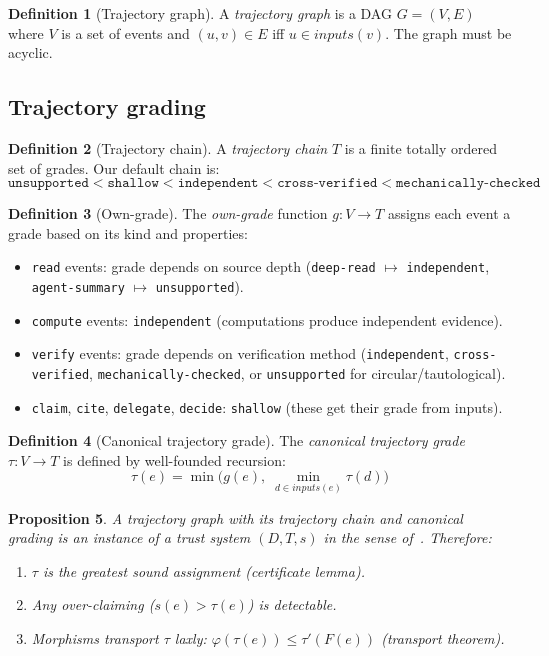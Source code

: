 \documentclass[11pt,a4paper]{article}
\theoremstyle{definition}
\newtheorem{definition}{Definition}[section]
\theoremstyle{plain}
\newtheorem{proposition}[definition]{Proposition}
\theoremstyle{remark}
\begin{document}
\begin{definition}[Trajectory graph]
A \emph{trajectory graph} is a DAG $G = (V, E)$ where $V$ is a set of events and $(u, v) \in E$ iff $u \in \mathit{inputs}(v)$. The graph must be acyclic.
\end{definition}

\subsection{Trajectory grading}

\begin{definition}[Trajectory chain]
A \emph{trajectory chain} $T$ is a finite totally ordered set of grades. Our default chain is:
\[
\texttt{unsupported} < \texttt{shallow} < \texttt{independent} < \texttt{cross-verified} < \texttt{mechanically-checked}
\]
\end{definition}

\begin{definition}[Own-grade]
The \emph{own-grade} function $g : V \to T$ assigns each event a grade based on its kind and properties:
\begin{itemize}
\item \texttt{read} events: grade depends on source depth (\texttt{deep-read} $\mapsto$ \texttt{independent}, \texttt{agent-summary} $\mapsto$ \texttt{unsupported}).
\item \texttt{compute} events: \texttt{independent} (computations produce independent evidence).
\item \texttt{verify} events: grade depends on verification method (\texttt{independent}, \texttt{cross-verified}, \texttt{mechanically-checked}, or \texttt{unsupported} for circular/tautological).
\item \texttt{claim}, \texttt{cite}, \texttt{delegate}, \texttt{decide}: \texttt{shallow} (these get their grade from inputs).
\end{itemize}
\end{definition}

\begin{definition}[Canonical trajectory grade]
The \emph{canonical trajectory grade} $\tau : V \to T$ is defined by well-founded recursion:
\[
\tau(e) = \min\bigl(g(e),\; \min_{d \in \mathit{inputs}(e)} \tau(d)\bigr)
\]
\end{definition}

\begin{proposition}\label{prop:instance}
A trajectory graph with its trajectory chain and canonical grading is an instance of a trust system $(D, T, s)$ in the sense of~\emph{\cite{trust-boundaries}}. Therefore:
\begin{enumerate}
\item $\tau$ is the greatest sound assignment (certificate lemma).
\item Any over-claiming ($s(e) > \tau(e)$) is detectable.
\item Morphisms transport $\tau$ laxly: $\varphi(\tau(e)) \leq \tau'(F(e))$ (transport theorem).
\end{enumerate}
\end{proposition}
\end{document}
